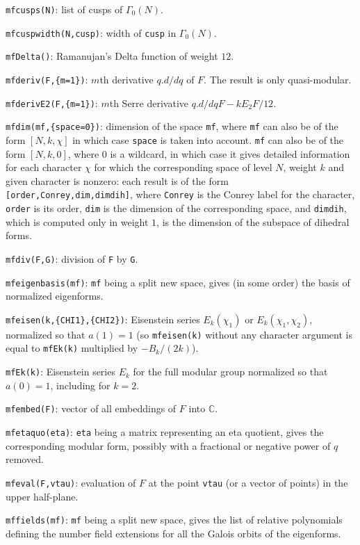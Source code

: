 \documentclass[11pt]{article}
\newcommand{\C}{{\mathbb C}}
\newcommand{\G}{\Gamma}
\def\kbd#1{{\tt #1}}
\begin{document}
\kbd{mfcusps(N)}: list of cusps of $\G_0(N)$.

\kbd{mfcuspwidth(N,cusp)}: width of \kbd{cusp} in $\G_0(N)$.

\kbd{mfDelta()}: Ramanujan's Delta function of weight $12$.

\kbd{mfderiv(F,\{m=1\})}: $m$th derivative $q.d/dq$ of $F$. The result is
only quasi-modular.

\kbd{mfderivE2(F,\{m=1\})}: $m$th Serre derivative $q.d/dq F-kE_2F/12$.

\kbd{mfdim(mf,\{space=0\})}: dimension of the space \kbd{mf}, where \kbd{mf}
can also be of the form $[N,k,\chi]$ in which case \kbd{space} is taken into
account. \kbd{mf} can also be of the form $[N,k,0]$, where $0$ is a wildcard,
in which case it gives detailed information for each character $\chi$
for which the corresponding space of level $N$, weight $k$ and given
character is nonzero: each result is of the form
\kbd{[order,Conrey,dim,dimdih]}, where \kbd{Conrey} is the
Conrey label for the character, \kbd{order} is its order, \kbd{dim} is
the dimension of the corresponding space, and \kbd{dimdih}, which is
computed only in weight $1$, is the dimension of the subspace of dihedral
forms.

\kbd{mfdiv(F,G)}: division of \kbd{F} by \kbd{G}.

\kbd{mfeigenbasis(mf)}: \kbd{mf} being a split new space, gives (in some order)
the basis of normalized eigenforms.

\kbd{mfeisen(k,\{CHI1\},\{CHI2\})}: Eisenstein series $E_k(\chi_1)$ or
$E_k(\chi_1,\chi_2)$, normalized so that $a(1)=1$ (so \kbd{mfeisen(k)} without
any character argument is equal to \kbd{mfEk(k)} multiplied by $-B_k/(2k)$).

\kbd{mfEk(k)}: Eisenstein series $E_k$ for the full modular group normalized
so that $a(0)=1$, including for $k=2$.

\kbd{mfembed(F)}: vector of all embeddings of $F$ into $\C$.

\kbd{mfetaquo(eta)}: \kbd{eta} being a matrix representing an eta quotient,
gives the corresponding modular form, possibly with a fractional or negative
power of $q$ removed.

\kbd{mfeval(F,vtau)}: evaluation of $F$ at the point \kbd{vtau} (or a
vector of points) in the upper half-plane.

\kbd{mffields(mf)}: \kbd{mf} being a split new space, gives the list of
relative polynomials defining the number field extensions for all the Galois
orbits of the eigenforms.
\end{document}
